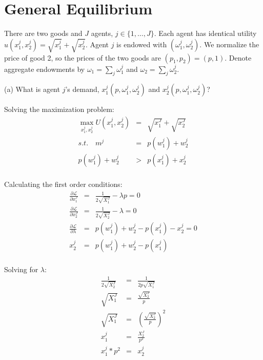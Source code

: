 \section{General Equilibrium}

There are two goods and \( J \) agents, \( j \in \{1, \ldots, J\} \). Each agent has identical utility \( u(x^j_1, x^j_2) = \sqrt{x^j_1} + \sqrt{x^j_2} \). Agent \( j \) is endowed with \( (\omega^j_1, \omega^j_2) \). We normalize the price of good 2, so the prices of the two goods are \( (p_1, p_2) = (p, 1) \). Denote aggregate endowments by \( \omega_1 = \sum_j \omega^j_1 \) and \( \omega_2 = \sum_j \omega^j_2 \).


\begin{tcolorbox}
    (a) What is agent \( j \)'s demand, \( x^j_1(p, \omega^j_1, \omega^j_2) \) and \( x^j_2(p, \omega^j_1, \omega^j_2) \)?
\end{tcolorbox}

Solving the maximization problem:
\begin{eqnarray*}
\max_{x_1^j, x_2^j} U(x_1^j,x_2^j)&=&\sqrt{x_1^J}+\sqrt{x_2^J}\\
s.t. \quad m^j&=&p(w_1^j)+w_2^j\\
p(w_1^j)+w_2^j&>&p(x_1^j)+x_2^j\\
\end{eqnarray*}

Calculating the first order conditions:
\begin{eqnarray*}
\frac{\partial \mathcal{L}}{\partial x_1^J}&=&\frac{1}{2\sqrt{X_1^J}}-λp=0\\
\frac{\partial \mathcal{L}}{\partial x_2^J}&=&\frac{1}{2\sqrt{X_2^J}}-λ=0\\
\frac{\partial \mathcal{L}}{\partial \lambda}&=&p(w_1^j)+w_2^j-p(x_1^j)-x_2^j=0\\
x_2^j&=&p(w_1^j)+w_2^j-p(x_1^j)\\
\end{eqnarray*}

Solving for $\lambda$:
\begin{eqnarray*}
\frac{1}{2\sqrt{X_2^J}}&=&\frac{1}{2p\sqrt{X_1^J}}\\
\sqrt{X_1^J}&=&\frac{\sqrt{X_2^J}}{p}\\
\sqrt{X_1^J}&=&(\frac{\sqrt{X_2^J}}{p})^2\\
x_1^j&=&\frac{X_2^J}{p^2}\\
x_1^j*p^2&=&x_2^j\\
\end{eqnarray*}

